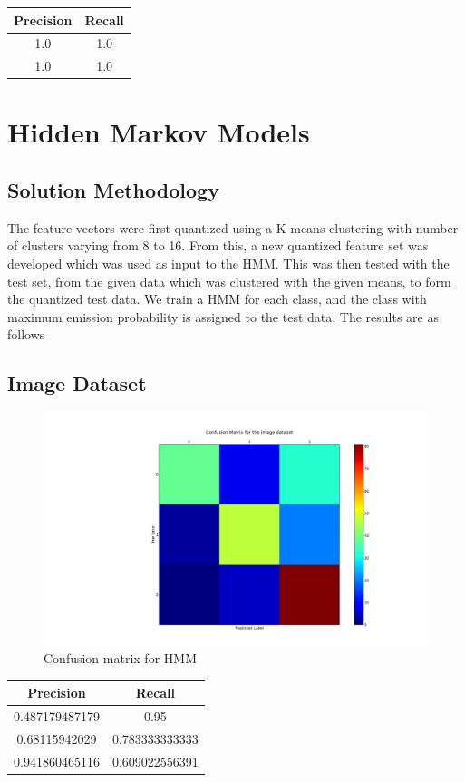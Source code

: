 \documentclass[11pt,a4paper]{article}
\begin{document}
\begin{center}
\begin{tabular}{|c|c|}
\hline
\textbf{Precision} & \textbf{Recall} \\ \hline
1.0 & 1.0 \\ \hline
1.0 & 1.0 \\ \hline
\end{tabular}

\end{center}


\section{Hidden Markov Models}
\subsection{Solution Methodology}
The feature vectors were first quantized using a K-means clustering with number of clusters varying from 8 to 16. From this, a new quantized feature set was developed which was used as input to the HMM. This was then tested with the test set, from the given data which was clustered with the given means, to form the  quantized test data. We train a HMM for each class, and the class with maximum emission probability is assigned to the test data. The results are as follows
\subsection{Image Dataset}
\begin{figure}[H]
  \centering
  \includegraphics[width=.8\linewidth]{confusion_image_2.png}
\caption{Confusion matrix for HMM}
  \label{fig:sfig1}
\end{figure}%
\begin{center}
\begin{tabular}{|c|c|}
\hline
\textbf{Precision} & \textbf{Recall} \\ \hline
0.487179487179 & 0.95 \\ \hline
0.68115942029 & 0.783333333333 \\ \hline
0.941860465116 & 0.609022556391 \\ \hline
\end{tabular}

\end{center}
\end{document}
